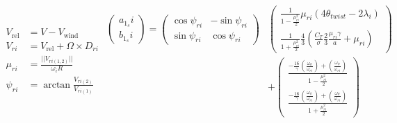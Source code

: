     \begin{subequations}
        \label{eq:observer:flapping}
        \begin{align}
            V_{\text{rel}} &= V - V_{\text{wind}} \\
%
            V_{ri} &= V_{\text{rel}} + \Omega \times D_{ri} \\ %
%
            \mu_{ri} &= \frac{||V_{ri(1,2)}||}{\omega_{i}R} \\
%
            \psi_{ri} &= \arctan{\frac{V_{ri(2)}}{V_{ri(1)}}} %
        \end{align}
        \begin{equation}
            \label{eq:observer:flapping:ab}
            \begin{array}{rr}\left(
                \begin{array}{c}
                    a_{1_{s}}i \\
                    b_{1_{s}}i
                \end{array} \right)
                = \left(
                \begin{array}{cc}
                    \cos{\psi_{ri}} & -\sin{\psi_{ri}} \\
                    \sin{\psi_{ri}} & \cos{\psi_{ri}}
                \end{array}
                \right) & \left(
                    \begin{array}{c}
                        \frac{1}{1 - \frac{\mu_{ri}^{2}}{2}}\mu_{ri}\left( 4 \theta_{twist} - 2\lambda_{i}\right) \\
                        \frac{1}{1 + \frac{\mu_{ri}^{2}}{2}}\frac{4}{3}\left( \frac{C_{T}}{\sigma}\frac{2}{3}\frac{\mu_{ri}\gamma}{a} + \mu_{ri}\right)
                    \end{array}
                \right) \\
                & +
                \left(
                    \begin{array}{c}
                        \frac{-\frac{16}{\gamma}\left(\frac{\omega_{\theta}}{\omega_{ri}}\right) + \left(\frac{\omega_{\psi}}{\omega_{ri}}\right)}{1 - \frac{\mu_{ri}^{2}}{2}} \\
                        \frac{-\frac{16}{\gamma}\left(\frac{\omega_{\psi}}{\omega_{ri}}\right) + \left(\frac{\omega_{\theta}}{\omega_{ri}}\right)}{1 + \frac{\mu_{ri}^{2}}{2}}
                    \end{array}
                \right)
            \end{array}
        \end{equation}


\end{subequations}
